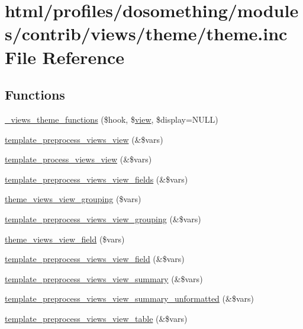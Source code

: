 \hypertarget{views_2theme_2theme_8inc}{
\section{html/profiles/dosomething/modules/contrib/views/theme/theme.inc File Reference}
\label{views_2theme_2theme_8inc}
}
\subsection*{Functions}
\begin{DoxyCompactItemize}
\item 
\hyperlink{views_2theme_2theme_8inc_acf9e7bcb84ebc378f901f483143d0ff0}{\_\-views\_\-theme\_\-functions} (\$hook, \$\hyperlink{classview}{view}, \$display=NULL)
\item 
\hyperlink{views_2theme_2theme_8inc_a9390b0a0ab9315839031fadfc73df433}{template\_\-preprocess\_\-views\_\-view} (\&\$vars)
\item 
\hyperlink{views_2theme_2theme_8inc_abc6cc4b40163cbc48a4fa70dc1a17b8e}{template\_\-process\_\-views\_\-view} (\&\$vars)
\item 
\hyperlink{views_2theme_2theme_8inc_a31ac9f4fe094685ae98063fe1ffbe341}{template\_\-preprocess\_\-views\_\-view\_\-fields} (\&\$vars)
\item 
\hyperlink{views_2theme_2theme_8inc_ad940f51fabee918aa8e62942c83c12ee}{theme\_\-views\_\-view\_\-grouping} (\$vars)
\item 
\hyperlink{views_2theme_2theme_8inc_a9ae18dd412333dcc63a233072c347a72}{template\_\-preprocess\_\-views\_\-view\_\-grouping} (\&\$vars)
\item 
\hyperlink{views_2theme_2theme_8inc_a339c44eecedc5e7219039007984a2cab}{theme\_\-views\_\-view\_\-field} (\$vars)
\item 
\hyperlink{views_2theme_2theme_8inc_a182621c56fc066ed50344ee82c900218}{template\_\-preprocess\_\-views\_\-view\_\-field} (\&\$vars)
\item 
\hyperlink{views_2theme_2theme_8inc_af9bd148476c77cdff1cca62726a24bd9}{template\_\-preprocess\_\-views\_\-view\_\-summary} (\&\$vars)
\item 
\hyperlink{views_2theme_2theme_8inc_a62db89119e83936916ee3a538547ee94}{template\_\-preprocess\_\-views\_\-view\_\-summary\_\-unformatted} (\&\$vars)
\item 
\hyperlink{views_2theme_2theme_8inc_a0a837e138fb5af6ed94f0a920f9cce27}{template\_\-preprocess\_\-views\_\-view\_\-table} (\&\$vars)

\end{DoxyCompactItemize}
